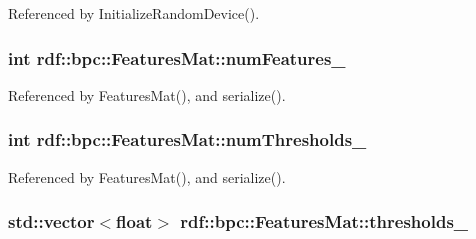 Referenced by Initialize\+Random\+Device().

\subsubsection[{\texorpdfstring{num\+Features\+\_\+}{numFeatures_}}]{\setlength{\rightskip}{0pt plus 5cm}int rdf\+::bpc\+::\+Features\+Mat\+::num\+Features\+\_\+\hspace{0.3cm}{\ttfamily [private]}}\hypertarget{classrdf_1_1bpc_1_1FeaturesMat_acc84dd8b048451bbe7be60dce7c3417c}{}\label{classrdf_1_1bpc_1_1FeaturesMat_acc84dd8b048451bbe7be60dce7c3417c}


Referenced by Features\+Mat(), and serialize().

\subsubsection[{\texorpdfstring{num\+Thresholds\+\_\+}{numThresholds_}}]{\setlength{\rightskip}{0pt plus 5cm}int rdf\+::bpc\+::\+Features\+Mat\+::num\+Thresholds\+\_\+\hspace{0.3cm}{\ttfamily [private]}}\hypertarget{classrdf_1_1bpc_1_1FeaturesMat_aeb9a1a867455c3bb26292ff63fe6aada}{}\label{classrdf_1_1bpc_1_1FeaturesMat_aeb9a1a867455c3bb26292ff63fe6aada}


Referenced by Features\+Mat(), and serialize().

\subsubsection[{\texorpdfstring{thresholds\+\_\+}{thresholds_}}]{\setlength{\rightskip}{0pt plus 5cm}std\+::vector$<$float$>$ rdf\+::bpc\+::\+Features\+Mat\+::thresholds\+\_\+\hspace{0.3cm}{\ttfamily [private]}}\hypertarget{classrdf_1_1bpc_1_1FeaturesMat_af78d3fa0ca76bc3ec1102772fcbac819}{}\label{classrdf_1_1bpc_1_1FeaturesMat_af78d3fa0ca76bc3ec1102772fcbac819}


